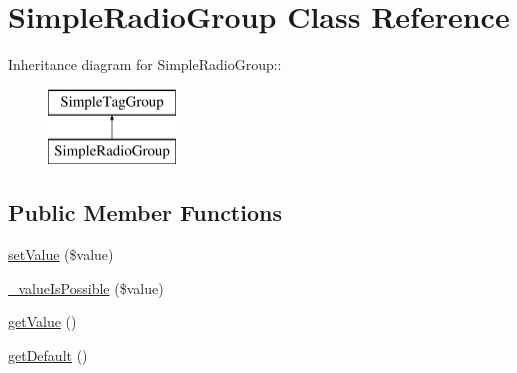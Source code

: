 \hypertarget{class_simple_radio_group}{
\section{SimpleRadioGroup Class Reference}
\label{class_simple_radio_group}
}
Inheritance diagram for SimpleRadioGroup::\begin{figure}[H]
\begin{center}
\leavevmode
\includegraphics[height=2cm]{class_simple_radio_group}
\end{center}
\end{figure}
\subsection*{Public Member Functions}
\begin{DoxyCompactItemize}
\item 
\hyperlink{class_simple_radio_group_a013490f1ead7db2b42af159ac71a1272}{setValue} (\$value)
\item 
\hyperlink{class_simple_radio_group_a810f7be694c8ebec2b72308d062fb567}{\_\-valueIsPossible} (\$value)
\item 
\hyperlink{class_simple_radio_group_a4fe55d05e9df72bc09ef03b05532520e}{getValue} ()
\item 
\hyperlink{class_simple_radio_group_a2cf7703fd1d0a439a63fff94f18ea5c8}{getDefault} ()
\end{DoxyCompactItemize}


